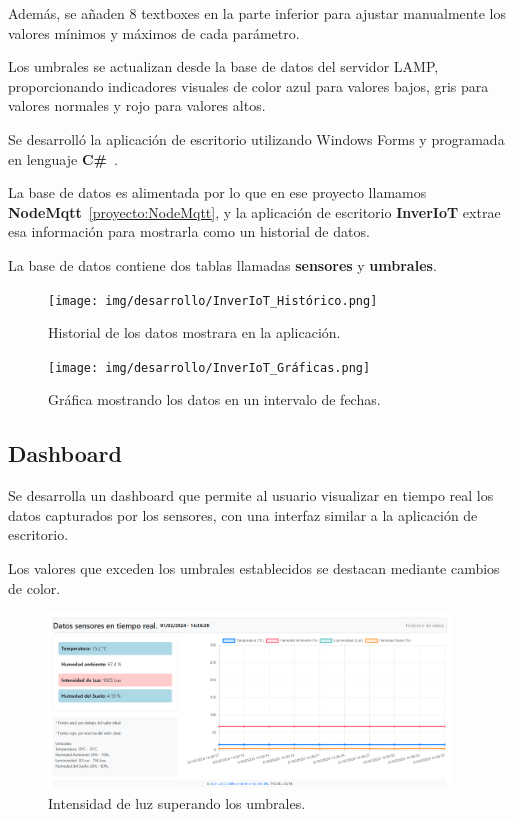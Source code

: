 Además, se añaden 8 textboxes en la parte inferior para ajustar manualmente los valores mínimos y máximos de cada parámetro.

Los umbrales se actualizan desde la base de datos del servidor LAMP, proporcionando indicadores visuales de color azul para valores bajos, gris para valores normales y rojo para valores altos.

Se desarrolló la aplicación de escritorio utilizando Windows Forms y programada en lenguaje \textbf{C\#}~\cite{manual:CSharp}.


La base de datos es alimentada por lo que en ese proyecto llamamos \textbf{NodeMqtt}~\ref{proyecto:NodeMqtt}, y la aplicación de escritorio \textbf{InverIoT} extrae esa información para mostrarla como un historial de datos.

La base de datos contiene dos tablas llamadas \textbf{sensores} y \textbf{umbrales}.

\begin{figure}[h]
    \centering
    \texttt{[image: img/desarrollo/InverIoT\_Histórico.png]}
    \caption{Historial de los datos mostrara en la aplicación.}
\end{figure}


\begin{figure}[h]
    \centering
    \texttt{[image: img/desarrollo/InverIoT\_Gráficas.png]}
    \caption{Gráfica mostrando los datos en un intervalo de fechas.}
\end{figure}
\pagebreak

\subsection{Dashboard}\label{proyecto:Dashboard}
Se desarrolla un dashboard que permite al usuario visualizar en tiempo real los datos capturados por los sensores, con una interfaz similar a la aplicación de escritorio.

Los valores que exceden los umbrales establecidos se destacan mediante cambios de color.

\begin{figure}[h]
    \centering
    \includegraphics[width=0.95\textwidth]{img/desarrollo/Dashboard1.png}
    \caption{Intensidad de luz superando los umbrales.} \label{Img:Dashboard1}
\end{figure}

